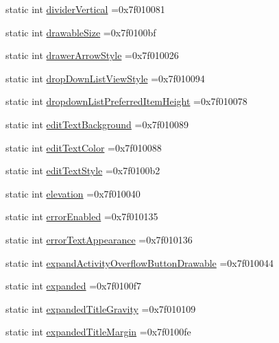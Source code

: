 \begin{DoxyCompactItemize}
\item 
static int \hyperlink{classandroid_1_1support_1_1v4_1_1R_1_1attr_a94bef3415e2e39d667f0fecd21873aaa}{divider\+Vertical} =0x7f010081
\item 
static int \hyperlink{classandroid_1_1support_1_1v4_1_1R_1_1attr_a158e95bf8e6d89159dc97c65f16f1957}{drawable\+Size} =0x7f0100bf
\item 
static int \hyperlink{classandroid_1_1support_1_1v4_1_1R_1_1attr_acc9a8baf55ed984cc577be9f5aed18dd}{drawer\+Arrow\+Style} =0x7f010026
\item 
static int \hyperlink{classandroid_1_1support_1_1v4_1_1R_1_1attr_a2b5afda32e7bb835a1f0d4c087801418}{drop\+Down\+List\+View\+Style} =0x7f010094
\item 
static int \hyperlink{classandroid_1_1support_1_1v4_1_1R_1_1attr_af2e9cb4e052fc2c281ed319a8757c615}{dropdown\+List\+Preferred\+Item\+Height} =0x7f010078
\item 
static int \hyperlink{classandroid_1_1support_1_1v4_1_1R_1_1attr_a80537fe05e995799ee013712788c6ca6}{edit\+Text\+Background} =0x7f010089
\item 
static int \hyperlink{classandroid_1_1support_1_1v4_1_1R_1_1attr_a1b8c77d88fd0903a7e6138e4e35cf69e}{edit\+Text\+Color} =0x7f010088
\item 
static int \hyperlink{classandroid_1_1support_1_1v4_1_1R_1_1attr_a2a44b95ba45feb6b9848f66f16044f7d}{edit\+Text\+Style} =0x7f0100b2
\item 
static int \hyperlink{classandroid_1_1support_1_1v4_1_1R_1_1attr_a5906f91b859c693a38a88ad3b0be4a39}{elevation} =0x7f010040
\item 
static int \hyperlink{classandroid_1_1support_1_1v4_1_1R_1_1attr_aeef469d93380b66cf16047dc17b8399c}{error\+Enabled} =0x7f010135
\item 
static int \hyperlink{classandroid_1_1support_1_1v4_1_1R_1_1attr_a8af4dbdff7c093c06f9d39eb500ec3ec}{error\+Text\+Appearance} =0x7f010136
\item 
static int \hyperlink{classandroid_1_1support_1_1v4_1_1R_1_1attr_a6ce1e5650d7bdbaf6f02bb9f1c21ac55}{expand\+Activity\+Overflow\+Button\+Drawable} =0x7f010044
\item 
static int \hyperlink{classandroid_1_1support_1_1v4_1_1R_1_1attr_a2c4f03dade210005e1bf41ee7b9383b1}{expanded} =0x7f0100f7
\item 
static int \hyperlink{classandroid_1_1support_1_1v4_1_1R_1_1attr_ae9bc589f12bff8017da7402e0b008111}{expanded\+Title\+Gravity} =0x7f010109
\item 
static int \hyperlink{classandroid_1_1support_1_1v4_1_1R_1_1attr_a4253f12931205653e5fd1755c2755fc5}{expanded\+Title\+Margin} =0x7f0100fe

\end{DoxyCompactItemize}

